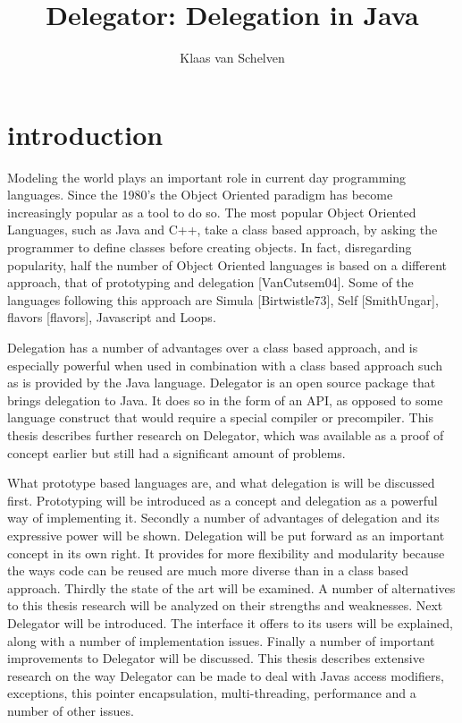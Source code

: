 \documentclass[a4paper,12pt]{book}
\title{Delegator: Delegation in Java}
\author{Klaas van Schelven}
\begin{document}
\maketitle


\chapter{introduction}
Modeling the world plays an important role in current day programming languages. Since the 1980's the Object Oriented paradigm has become increasingly popular as a tool to do so. The most popular Object Oriented Languages, such as Java and C++, take a class based approach, by asking the programmer to define classes before creating objects. In fact, disregarding popularity, half  the number of Object Oriented languages is based on a different approach, that of prototyping and delegation [VanCutsem04]. Some of the languages following this approach are Simula [Birtwistle73], Self [SmithUngar], flavors [flavors], Javascript and Loops.

Delegation has a number of advantages over a class based approach, and is especially powerful when used in combination with a class based approach such as is provided by the Java language. Delegator is an open source package that brings delegation to Java. It does so in the form of an API, as opposed to some language construct that would require a special compiler or precompiler. This thesis describes further research on Delegator, which was available as a proof of concept earlier but still had a significant amount of problems.

What prototype based languages are, and what delegation is will be discussed first. Prototyping will be introduced as a concept and delegation as a powerful way of implementing it. Secondly a number of advantages of delegation and its expressive power will be shown. Delegation will be put forward as an important concept in its own right. It provides for more flexibility and modularity because the ways code can be reused are much more diverse than in a class based approach. Thirdly the state of the art will be examined. A number of alternatives to this thesis research will be analyzed on their strengths and weaknesses. Next Delegator will be introduced. The interface it offers to its users will be explained, along with a number of implementation issues. Finally a number of important improvements to Delegator will be discussed. This thesis describes extensive research on the way Delegator can be made to deal with Javas access modifiers, exceptions, this pointer encapsulation, multi-threading, performance and a number of other issues.
\end{document}
